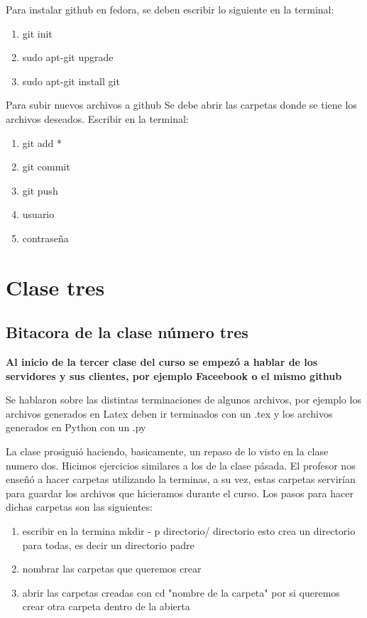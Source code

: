 \documentclass{book}
\begin{document}
\begin{enumerate}
\begin{enumerate}
	\end{enumerate}
	Para instalar github en fedora, se deben escribir lo siguiente en la terminal: 
	\begin{enumerate}
		\item git init
		\item sudo apt-git upgrade
		\item sudo apt-git install git
	\end{enumerate}
	
	
	Para subir nuevos archivos a github
	Se debe abrir las carpetas donde se tiene los archivos deseados. 
	Escribir en la terminal:
	\begin{enumerate}
		\item git add *
		\item git commit
		\item git push
		\item usuario
		\item contraseña
	\end{enumerate}
\end{enumerate}

\chapter{Clase tres}
\section{Bitacora de la clase número tres}

\textbf{Al inicio de la tercer clase del curso se empezó a hablar de los servidores y sus clientes, por ejemplo Faceebook o el mismo github}

Se hablaron sobre las distintas terminaciones de algunos archivos, por ejemplo los archivos generados en Latex deben ir terminados con un .tex y los archivos generados en Python con un .py

La clase prosiguió haciendo, basicamente, un repaso de lo visto en la clase numero dos. Hicimos ejercicios similares a los de la clase pásada. 
El profesor nos enseñó a hacer carpetas utilizando la terminas, a su vez, estas carpetas servirían para guardar los archivos que hicieramos durante el curso. Los pasos para hacer dichas carpetas son las siguientes:
\begin{enumerate}
	\item escribir en la termina mkdir - p directorio/ directorio esto crea un directorio para todas, es decir un directorio padre
	\item nombrar las carpetas que queremos crear 
	\item abrir las carpetas creadas con cd "nombre de la carpeta" por si queremos crear otra carpeta dentro de la abierta
	
	
\end{enumerate}
\end{document}
